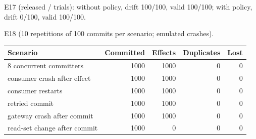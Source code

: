 E17 (released / trials): without policy, drift 100/100, valid 100/100; with policy, drift 0/100, valid 100/100.

E18 (10 repetitions of 100 commits per scenario; emulated crashes).
\begin{center}\small\begin{tabular}{@{}lrrrr@{}}\toprule
\textbf{Scenario} & \textbf{Committed} & \textbf{Effects} & \textbf{Duplicates} & \textbf{Lost} \\
\midrule
8 concurrent committers & 1000 & 1000 & 0 & 0 \\
consumer crash after effect & 1000 & 1000 & 0 & 0 \\
consumer restarts & 1000 & 1000 & 0 & 0 \\
retried commit & 1000 & 1000 & 0 & 0 \\
gateway crash after commit & 1000 & 1000 & 0 & 0 \\
read-set change after commit & 1000 & 0 & 0 & 0 \\
\bottomrule\end{tabular}\end{center}
